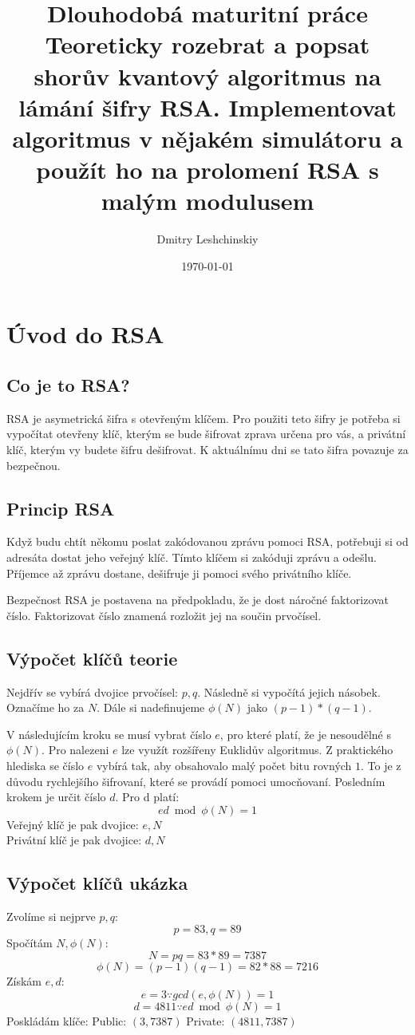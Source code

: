 \documentclass[11pt]{article}
\title{Dlouhodobá maturitní práce \\
\large Teoreticky rozebrat a popsat shorův kvantový algoritmus na lámání šifry RSA. 
Implementovat algoritmus v nějakém simulátoru a použít ho na prolomení RSA s malým modulusem}
\author{Dmitry Leshchinskiy}
\date{\today}
\begin{document}
\maketitle
\newpage

\tableofcontents
\newpage

\section{Úvod do RSA}
\subsection{Co je to RSA?}

RSA je asymetrická šifra s otevřeným klíčem.
Pro použiti teto šifry je potřeba si vypočítat otevřeny klíč, kterým se bude šifrovat zprava určena pro vás, a privátní klíč, kterým vy budete šifru dešifrovat.
K aktuálnímu dni se tato šifra povazuje za bezpečnou.

\subsection{Princip RSA}
Když budu chtít někomu poslat zakódovanou zprávu pomoci RSA, potřebuji si od adresáta dostat jeho veřejný klíč.
Tímto klíčem si zakóduji zprávu a odešlu.
Příjemce až zprávu dostane, dešifruje ji pomoci svého privátního klíče.
\par Bezpečnost RSA je postavena na předpokladu, že je dost náročné faktorizovat číslo.
Faktorizovat číslo znamená rozložit jej na součin prvočísel.

\subsection{Výpočet klíčů teorie}
Nejdřív se vybírá dvojice prvočísel: $p, q$.
Následně si vypočítá jejich násobek. Označíme ho za $N$.
Dále si nadefinujeme $\phi (N)$ jako $(p - 1) * (q - 1)$.
\par V následujícím kroku se musí vybrat číslo $e$, pro které platí, že je nesoudělné s $\phi (N)$.
Pro nalezeni $e$ lze využít rozšířeny Euklidův algoritmus.
Z praktického hlediska se číslo $e$ vybírá tak, aby obsahovalo malý počet bitu rovných $1$.
To je z důvodu rychlejšího šifrovaní, které se provádí pomoci umocňovaní.
Posledním krokem je určit číslo $d$. Pro d platí:
$$ ed \bmod \phi (N) = 1 $$
Veřejný klíč je pak dvojice: $e, N$ \\
Privátní klíč je pak dvojice: $d, N$

\subsection{Výpočet klíčů ukázka}
\noindent Zvolíme si nejprve $p, q$:
$$p = 83, q = 89$$
Spočítám $N, \phi (N)$:
$$N = pq = 83 * 89 = 7387$$
$$\phi (N) = (p - 1)(q - 1) = 82 * 88 = 7216$$
Získám $e, d$:
$$e = 3 \because gcd(e, \phi (N)) = 1$$
$$d = 4811 \because ed \bmod \phi (N) = 1$$
Poskládám klíče:
Public: $(3, 7387)$
Private: $(4811, 7387)$
\end{document}
